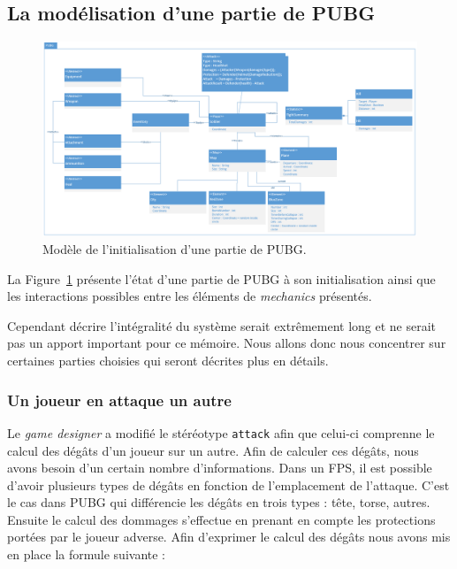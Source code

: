 \subsection{La modélisation d'une partie de PUBG}
\begin{figure}[H]
    \centering
    \includegraphics[width=\linewidth]{10_img/chap6/final_model.PNG}
    \caption{Modèle de l'initialisation d'une partie de PUBG.}
    \label{fig.attack}
\end{figure}


La Figure~\ref{fig.attack} présente l'état d'une partie de PUBG à son initialisation ainsi que les interactions possibles entre les éléments de \emph{mechanics} présentés.

Cependant décrire l'intégralité du système serait extrêmement long et ne serait pas un apport important pour ce mémoire. Nous allons donc nous concentrer sur certaines parties choisies qui seront décrites plus en détails.

\subsubsection{Un joueur en attaque un autre}

Le \emph{game designer} a modifié le stéréotype \texttt{attack} afin que celui-ci comprenne le calcul des dégâts d'un joueur sur un autre.
Afin de calculer ces dégâts, nous avons besoin d'un certain nombre d'informations.
Dans un FPS, il est possible d'avoir plusieurs types de dégâts en fonction de l'emplacement de l'attaque.
C'est le cas dans PUBG qui différencie les dégâts en trois types : tête, torse, autres.
Ensuite le calcul des dommages s'effectue en prenant en compte les protections portées par le joueur adverse.
Afin d'exprimer le calcul des dégâts nous avons mis en place la formule suivante :

